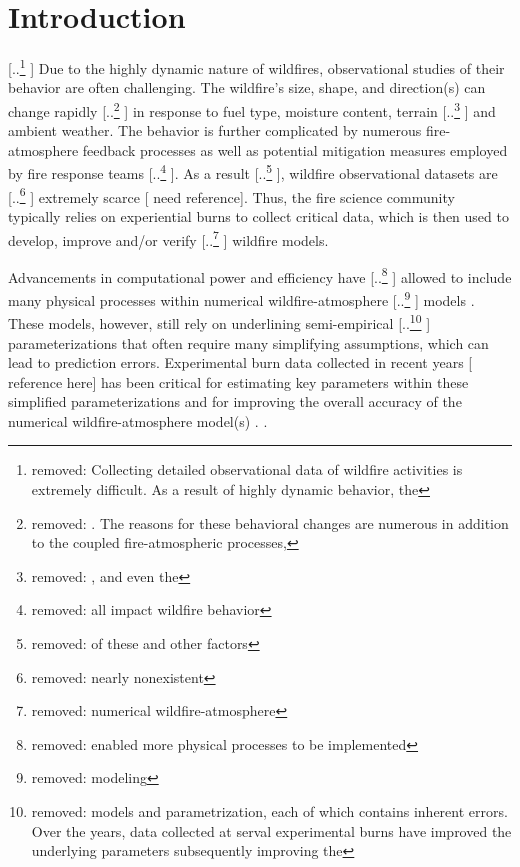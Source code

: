 \documentclass[preprints,article,accept,moreauthors,pdftex]{Definitions/mdpi}
\providecommand{\DIFadd}[1]{{\protect\color{blue} \sf #1}} %
\providecommand{\DIFdel}[1]{{\protect\color{red} [..\footnote{removed: #1} ]}} %
\providecommand{\DIFaddbegin}{} %
\providecommand{\DIFaddend}{} %
\providecommand{\DIFdelbegin}{} %
\providecommand{\DIFdelend}{} %
\begin{document}
\section{Introduction}


\DIFdelbegin \DIFdel{Collecting detailed observational data of wildfire activities is extremely difficult. As a result of highly dynamic behavior, the }\DIFdelend \DIFaddbegin \DIFadd{Due to the highly dynamic nature of wildfires, observational studies of their behavior are often challenging. The }\DIFaddend wildfire's size, shape, and direction(s) can change rapidly \DIFdelbegin \DIFdel{. The reasons for these behavioral changes are numerous in addition to the coupled fire-atmospheric processes, }\DIFdelend \DIFaddbegin \DIFadd{in response to }\DIFaddend fuel type, moisture content, terrain \DIFdelbegin \DIFdel{, and even the }\DIFdelend \DIFaddbegin \DIFadd{and ambient weather. The behavior is further complicated by numerous fire-atmosphere feedback processes as well as potential }\DIFaddend mitigation measures employed by fire response teams\DIFdelbegin \DIFdel{all impact wildfire behavior}\DIFdelend . As a result\DIFdelbegin \DIFdel{of these and other factors}\DIFdelend , wildfire observational datasets are \DIFdelbegin \DIFdel{nearly nonexistent}\DIFdelend \DIFaddbegin \DIFadd{extremely scarce }[\DIFadd{need reference}]\DIFaddend . Thus, the fire science community \DIFaddbegin \DIFadd{typically }\DIFaddend relies on experiential burns to collect critical data, which is then used to develop, improve and/or verify \DIFdelbegin \DIFdel{numerical wildfire-atmosphere }\DIFdelend \DIFaddbegin \DIFadd{wildfire }\DIFaddend models.

Advancements in computational power and efficiency have \DIFdelbegin \DIFdel{enabled more physical processes to be implemented }\DIFdelend \DIFaddbegin \DIFadd{allowed to include many physical processes }\DIFaddend within numerical wildfire-atmosphere \DIFdelbegin \DIFdel{modeling }\DIFdelend \DIFaddbegin \DIFadd{models }\DIFaddend \cite{kochanski_experimental_2018}. These models, \DIFaddbegin \DIFadd{however, }\DIFaddend still rely on underlining semi-empirical \DIFdelbegin \DIFdel{models and parametrization, each of which contains inherent errors. Over the years, data collected at serval experimental burns have improved the underlying parameters subsequently improving the }\DIFdelend \DIFaddbegin \DIFadd{parameterizations that often require many simplifying assumptions, which can lead to prediction errors. Experimental burn data collected in recent years }[\DIFadd{reference here}] \DIFadd{has been critical for estimating key parameters within these simplified parameterizations and for improving the overall }\DIFaddend accuracy of the numerical wildfire-atmosphere model(s)\DIFaddbegin \DIFadd{. }\DIFaddend \cite{kochanski_experimental_2018,mallia_incorporating_2020,kochanski_evaluation_2013,coen_requirements_2018}.
\end{document}
